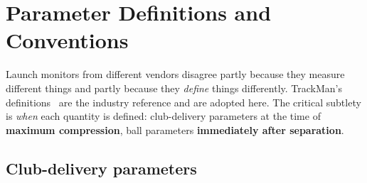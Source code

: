 \chapter{Parameter Definitions and Conventions}
\label{ch:params}

Launch monitors from different vendors disagree partly because they measure
different things and partly because they \emph{define} things differently.
TrackMan's definitions~\cite{trackman40params,trackmanclubdata} are the
industry reference and are adopted here. The critical subtlety is
\emph{when} each quantity is defined: club-delivery parameters at the time
of \textbf{maximum compression}, ball parameters \textbf{immediately after
separation}.

\section{Club-delivery parameters}
\label{sec:clubparams}

